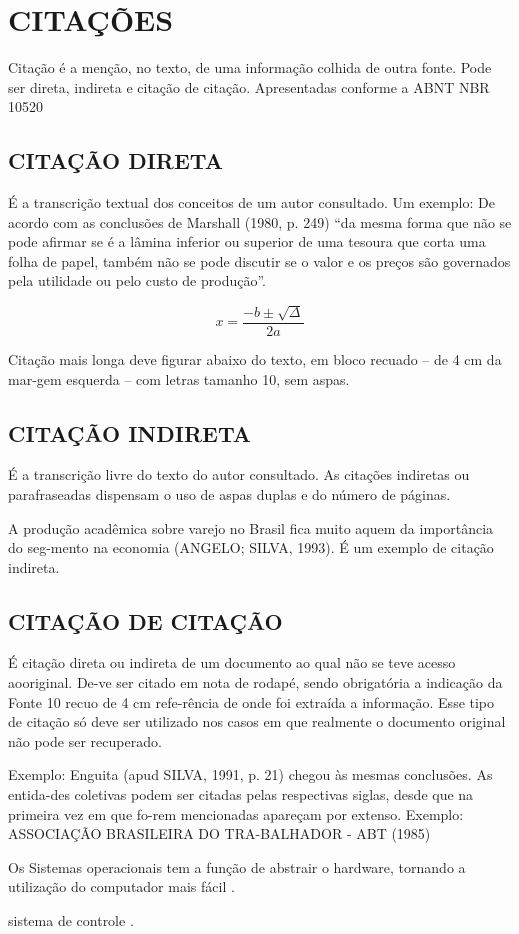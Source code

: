 %
%

\chapter{CITAÇÕES}

Citação é a menção, no texto, de uma informação colhida de outra fonte. Pode ser direta, indireta e citação de citação. Apresentadas conforme a ABNT NBR 10520

\section{CITAÇÃO DIRETA}

É a transcrição textual dos conceitos de um autor consultado. Um
exemplo: De acordo com as conclusões de Marshall (1980, p. 249) “da mesma forma que não se pode afirmar se é a lâmina inferior ou superior de uma tesoura que corta uma folha de papel, também não se pode discutir se o valor e os preços são governados pela utilidade ou pelo custo de produção”.

\begin{equation}
    x=\frac{-b\pm\sqrt{\Delta}}{2a}
\end{equation}

Citação mais longa deve figurar abaixo do texto, em bloco recuado
– de 4 cm da mar-gem esquerda – com letras tamanho 10, sem aspas.

\section{CITAÇÃO INDIRETA}

É a transcrição livre do texto do autor consultado. As citações
indiretas ou parafraseadas dispensam o uso de aspas duplas e do número de páginas.

A produção acadêmica sobre varejo no Brasil fica muito aquem da
importância do seg-mento na economia (ANGELO; SILVA, 1993). É um exemplo de citação indireta.

\section{CITAÇÃO DE CITAÇÃO}

É citação direta ou indireta de um documento ao qual não se teve
acesso aooriginal. De-ve ser citado em nota de rodapé, sendo obrigatória a indicação da Fonte 10 recuo de 4 cm refe-rência de onde foi extraída a informação. Esse tipo de citação só deve ser utilizado nos casos em que realmente o documento original não pode ser recuperado. 

Exemplo: Enguita (apud SILVA, 1991, p. 21) chegou às mesmas
conclusões. As entida-des coletivas podem ser citadas pelas respectivas siglas, desde que na primeira vez em que fo-rem mencionadas apareçam por extenso. Exemplo: ASSOCIAÇÃO BRASILEIRA DO TRA-BALHADOR - ABT (1985)


Os Sistemas operacionais tem a função de abstrair o hardware, tornando a utilização do computador mais fácil \cite{tanenbaum1995sistemas}.

sistema de controle \cite{de2017sistema}.
